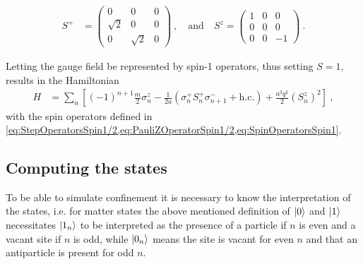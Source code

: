 \documentclass[../main.tex]{subfiles} %
\begin{document}
\begin{align} \label{eq:SpinOperatorsSpin1}
    S^+ &= \begin{pmatrix} 0 & 0 & 0 \\ \sqrt{2} & 0 & 0 \\ 0 & \sqrt{2} & 0 \end{pmatrix}
    \: , \quad \text{and} \quad
    S^z = \begin{pmatrix} 1 & 0 & 0 \\ 0 & 0 & 0 \\ 0 & 0 & -1 \end{pmatrix} \: .
\end{align}

Letting the gauge field be represented by spin-1 operators, thus setting $S = 1$, results in the Hamiltonian
\begin{align} \label{eq:LatticeSchwingerModelHamiltonianSpin_Actual}
    H &= \sum_n \left[ (-1)^{n+1} \frac{m}{2} \sigma_n^z - \frac{1}{2a} \left( \sigma_n^+ S_n^+ \sigma_{n+1}^- + \mathrm{h.c.} \right) + \frac{a^3 q^2}{2} \left( S_n^z \right)^2 \right] \: ,
\end{align}
with the spin operators defined in \cref{eq:StepOperatorsSpin1/2,eq:PauliZOperatorSpin1/2,eq:SpinOperatorsSpin1}.



\subsection{Computing the states} \label{sec:StateComputing}

To be able to simulate confinement it is necessary to know the interpretation of the states, i.e. for matter states the above mentioned definition of $\ket{0}$ and $\ket{1}$ necessitates $\ket{1_n}$ to be interpreted as the presence of a particle if $n$ is even and a vacant site if $n$ is odd, while $\ket{0_n}$ means the site is vacant for even $n$ and that an antiparticle is present for odd $n$.
\end{document}
